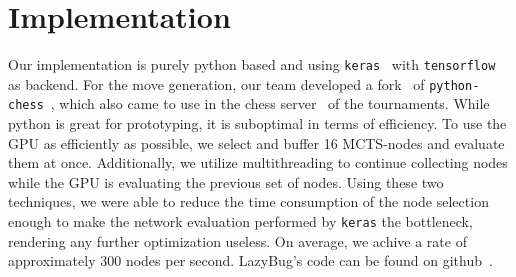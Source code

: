 \section{Implementation}

Our implementation is purely python based and using \texttt{keras}~\cite{keras} with \texttt{tensorflow}~\cite{tensorflow} as backend.
For the move generation, our team developed a fork~\cite{pychesstim} of \texttt{python-chess}~\cite{pychess}, which also came to use in the chess server~\cite{tinyChessServer} of the tournaments.
While python is great for prototyping, it is suboptimal in terms of efficiency.
To use the GPU as efficiently as possible, we select and buffer 16 MCTS-nodes and evaluate them at once.
Additionally, we utilize multithreading to continue collecting nodes while the GPU is evaluating the previous set of nodes.
Using these two techniques, we were able to reduce the time consumption of the node selection enough to make the network evaluation performed by \texttt{keras} the bottleneck, rendering any further optimization useless.
On average, we achive a rate of approximately 300 nodes per second.
LazyBug's code can be found on github~\cite{code}.
